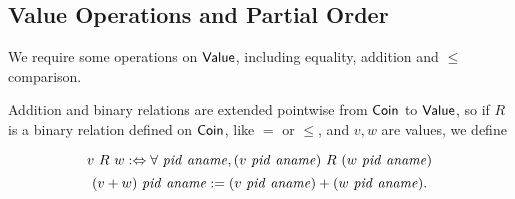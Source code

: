 \subsection*{Value Operations and Partial Order}
We require some operations on $\mathsf{Value}$, including equality, addition and $\leq$ comparison.

Addition and binary relations are extended pointwise from $\mathsf{Coin}$ to $\mathsf{Value}$, so if $R$ is a binary relation defined on $\mathsf{Coin}$, like $=$ or $\leq$, and $v, w$ are values, we define

\[ v~R~w :\Leftrightarrow \forall~\mathit{pid}~\mathit{aname}, (v~\mathit{pid}~\mathit{aname})~R~(w~\mathit{pid}~\mathit{aname}) \]
\[ (v + w)~\mathit{pid}~\mathit{aname} := (v~\mathit{pid}~\mathit{aname}) + (w~\mathit{pid}~\mathit{aname}). \]
